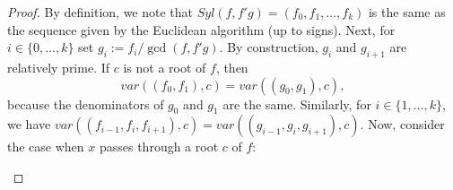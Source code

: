\documentclass[12pt]{amsart}
\theoremstyle{definition}
\begin{document}
\begin{proof} By definition, we note that $Syl(f,f'g) = (f_{0},f_{1},\dots, f_{k})$ is the same as the sequence given by the Euclidean algorithm (up to signs). Next, for $i\in\{0,\dots,k\}$ set $g_{i} := f_{i}/\gcd(f,f'g)$. By construction, $g_{i}$ and $g_{i+1}$ are relatively prime. If $c$ is not a root of $f$, then $$var\left((f_{0},f_{1}),c\right) = var\left((g_{0},g_{1}),c\right),$$ because the denominators of $g_{0}$ and $g_{1}$ are the same. Similarly, for $i\in\{1,\dots,k\}$, we have $var\left((f_{i-1},f_{i},f_{i+1}),c\right) = var\left((g_{i-1},g_{i},g_{i+1}),c\right)$. Now, consider the case when $x$ passes through a root $c$ of $f$:

\begin{table}[h]
\begin{subtable}{.3\linewidth}
\end{subtable}%
\begin{subtable}{.3\linewidth}
\end{subtable}
\end{table}


\end{proof}
\end{document}
